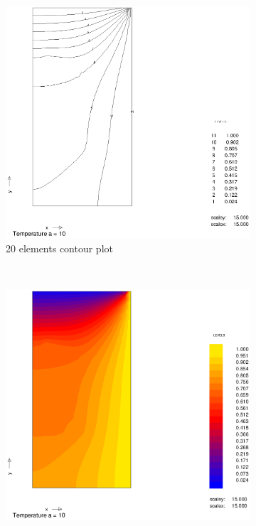 \documentclass[10pt,a4paper]{article}
\begin{document}
\begin{figure}[h]
\centering
        \begin{subfigure}[b]{0.45\textwidth}
                \includegraphics[width=\textwidth]{cont_a10_20el}
                \caption{20 elements contour plot}
                \label{fig:cont_a10_20el}
        \end{subfigure}
        ~
        \begin{subfigure}[b]{0.45\textwidth}
                \includegraphics[width=\textwidth]{colplot_a10_20el}

\end{subfigure}
\end{figure}
\end{document}
